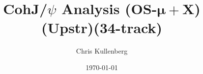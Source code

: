 \title{CohJ/$\psi$ Analysis (\textbf{OS}-$\boldsymbol{\mu+}$\textbf{X})(\textbf{Upstr})(\textbf{34-track})}
\author{Chris Kullenberg}
\date{\today}

